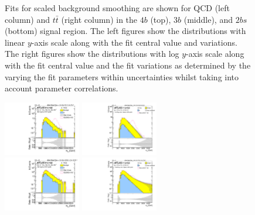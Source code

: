 \begin{figure}[htb!]
\begin{center}
\caption{Fits for scaled background smoothing are shown for QCD (left column) and $t\bar{t}$ (right column) in the $4b$ (top), $3b$ (middle), and $2bs$ (bottom) signal region.  The left figures show the distributions with linear $y$-axis scale along with the fit central value and variations. The right figures show the  distributions with log $y$-axis scale along with the fit central value and the fit variations as determined by the varying the fit parameters within uncertainties whilst taking into account parameter correlations. }
\label{fig:signal-region-mjjscaled-smoothing}
\end{center}
\end{figure}


\begin{figure}[htb!]
\begin{center}
\includegraphics[width=0.3\textwidth,angle=-90]{figures/boosted/Signal/b77_FourTag_Signal_mHH_pole_1_blind.pdf}
\includegraphics[width=0.3\textwidth,angle=-90]{figures/boosted/Smooth/Moriond_bkg_9_FourTag_pole_Signal_mHH_pole_1_blind.pdf}\\
\includegraphics[width=0.3\textwidth,angle=-90]{figures/boosted/Signal/b77_ThreeTag_Signal_mHH_pole_1_blind.pdf}
\includegraphics[width=0.3\textwidth,angle=-90]{figures/boosted/Smooth/Moriond_bkg_9_ThreeTag_pole_Signal_mHH_pole_1_blind.pdf}\\

\end{center}
\end{figure}
